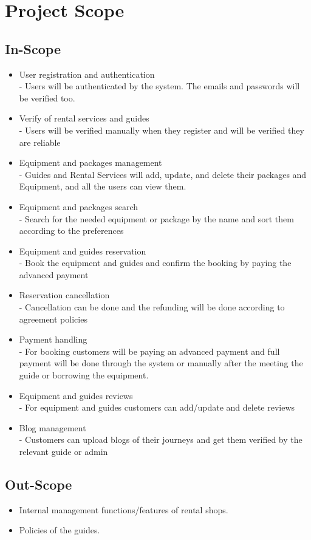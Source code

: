 \section{Project Scope}
\subsection{In-Scope}

\begin{itemize}

	\item User registration and authentication\\       
        - Users will be authenticated by the system.
        The emails and passwords will be verified too.
        
        \item Verify of rental services and guides\\
        - Users will be verified manually when they register and will be verified they are reliable
        
	\item Equipment and packages management\\
        - Guides and Rental Services will add, update, and delete their packages and Equipment, and all the users can view them.
        
	\item Equipment and packages search\\
        - Search for the needed equipment or package by
        the name and sort them according to the preferences 
        
	\item Equipment and guides reservation\\
        - Book the equipment and guides and confirm the booking by paying the advanced payment
        
	\item Reservation cancellation\\
        - Cancellation can be done and the refunding
        will be done according to agreement policies
        
	\item Payment handling\\
        - For booking customers will be paying an advanced payment and full payment will be done through the system or manually after the meeting the guide
        or borrowing the equipment. 
        
	\item Equipment and guides reviews\\
        - For equipment and guides customers can add/update and delete reviews
 
        \item Blog management\\
        - Customers can upload blogs of their journeys and get them verified by the relevant guide or admin

	
\end{itemize}

\subsection{Out-Scope}

\begin{itemize}
        \item Internal management functions/features of rental shops.
        \item Policies of the guides.
\end{itemize}